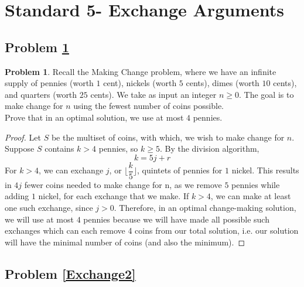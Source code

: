 \documentclass[11pt]{article}
\theoremstyle{definition}
\theoremstyle{definition}
\newtheorem{required}{Problem}
\theoremstyle{definition}
\newcommand{\floor}[1]{\lfloor #1 \rfloor}
\begin{document}
\newpage
\section{Standard 5- Exchange Arguments}

\subsection{Problem \ref{Exchange1}}
\begin{required} \label{Exchange1}
Recall the Making Change problem, where we have an infinite supply of pennies (worth $1$ cent), nickels (worth $5$ cents), dimes (worth $10$ cents), and quarters (worth $25$ cents). We take as input an integer $n \geq 0$. The goal is to make change for $n$ using the fewest number of coins possible. \\

\noindent Prove that in an optimal solution, we use at most $4$ pennies.
\end{required}

\begin{proof}

Let $S$ be the multiset of coins, with which, we wish to make change for $n$. Suppose $S$ contains $k > 4$ pennies, so $k \geq 5$. By the division algorithm,
\[
	k = 5j + r
\]
For $k > 4$, we can exchange $j$, or $\floor{\dfrac{k}{5}}$, quintets of pennies for $1$ nickel.
This results in $4j$ fewer coins needed to make change for n, as we remove $5$ pennies while adding $1$ nickel, for each exchange that we make. If $k > 4$, we can make at least
one such exchange, since $j > 0$. Therefore, in an optimal change-making solution, we will use at most $4$ pennies because we will have made all possible such exchanges which can each 
remove 4 coins from our total solution, i.e. our solution will have the minimal number of coins (and also the minimum).
\end{proof}



\newpage
\subsection{Problem \ref{Exchange2}}
\end{document}
